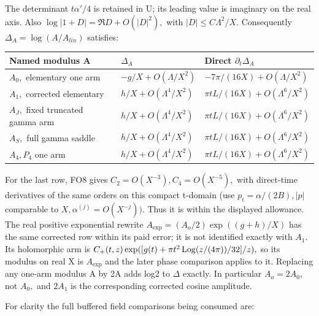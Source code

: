The determinant \(t \alpha'/4\) is retained in U; its leading value is imaginary on the real axis. Also \(\log|1+D|=\Re D+O(|D|^{2}),\) with \(|D|\le C \Lambda^{2}/X.\) Consequently \(\Delta_{A}=\log(A/A_{lin})\) satisfies:

\begingroup\small
\begin{longtable}{@{}>{\raggedright\arraybackslash}p{} >{\raggedright\arraybackslash}p{} >{\raggedright\arraybackslash}p{}@{}}
\toprule
Named modulus A & \(\Delta_{A}\) & Direct \(\partial_{t} \Delta_{A}\)\\
\midrule
\endhead
\(A_0,\) elementary one arm & $-g/X+O(\Lambda/X^2)$ & $-7\pi/(16X)+O(\Lambda/X^2)$\\
\(A_1,\) corrected elementary & $h/X+O(\Lambda^4/X^2)$ & $\pi tL/(16X)+O(\Lambda^6/X^2)$\\
\(A_{J},\) fixed truncated gamma arm & $h/X+O(\Lambda^4/X^2)$ & $\pi tL/(16X)+O(\Lambda^6/X^2)$\\
\(A_{S},\) full gamma saddle & $h/X+O(\Lambda^4/X^2)$ & $\pi tL/(16X)+O(\Lambda^6/X^2)$\\
\(A_4, P_{4}\) one arm & $h/X+O(\Lambda^4/X^2)$ & $\pi tL/(16X)+O(\Lambda^6/X^2)$\\
\bottomrule
\end{longtable}
\endgroup

For the last row, FO8 gives \(C_{2}=O(X^{-3}), C_{4}=O(X^{-5}),\) with direct-time derivatives of the same orders on this compact t-domain (use \(p_{t}=\alpha/(2B), |p|\) comparable to \(X, \alpha^{(j)}=O(X^{-j})).\) Thus it is within the displayed allowance. The real positive exponential rewrite \(A_{\exp}=(A_{o}/2)\exp((g+h)/X)\) has the same corrected row within its paid error; it is not identified exactly with \(A_1.\) Its holomorphic arm is \(C_+(t,z) \exp([g(t)+\pi t^{2} \operatorname{Log}(z/(4\pi))/32]/z),\) so its modulus on real X is \(A_{\exp}\) and the later phase comparison applies to it. Replacing any one-arm modulus A by 2A adds log2 to \(\Delta\) exactly. In particular \(A_{o}=2A_0,\) not \(A_0,\) and \(2A_1\) is the corresponding corrected cosine amplitude.

For clarity the full buffered field comparisons being consumed are:

